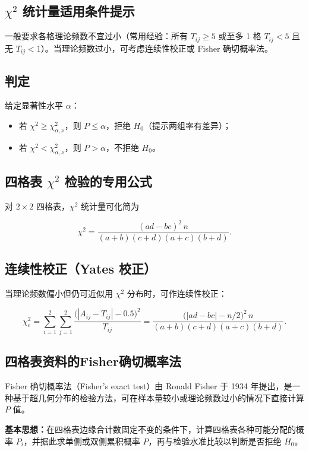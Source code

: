 \documentclass[lang=cn,10pt]{elegantbook}
\begin{document}
\subsection{$\chi^2$ 统计量适用条件提示}
一般要求各格理论频数不宜过小（常用经验：所有 $T_{ij}\ge 5$ 或至多 1 格 $T_{ij}<5$ 且无 $T_{ij}<1$）。当理论频数过小，可考虑连续性校正或 Fisher 确切概率法。

\subsection{判定}
给定显著性水平 $\alpha$：

\begin{itemize}
  \item 若 $\chi^2\ge \chi^2_{\alpha,\nu}$，则 $P\le \alpha$，拒绝 $H_0$（提示两组率有差异）；
  \item 若 $\chi^2< \chi^2_{\alpha,\nu}$，则 $P>\alpha$，不拒绝 $H_0$。
\end{itemize}

\subsection{四格表 $\chi^2$ 检验的专用公式}
对 $2\times 2$ 四格表，$\chi^2$ 统计量可化简为

\begin{equation}
  \chi^2=\frac{(ad-bc)^2\,n}{(a+b)(c+d)(a+c)(b+d)}.
\end{equation}

\subsection{连续性校正（Yates 校正）}
当理论频数偏小但仍可近似用 $\chi^2$ 分布时，可作连续性校正：

\begin{equation}
  \chi^2_c=\sum_{i=1}^{2}\sum_{j=1}^{2}\frac{\bigl(|A_{ij}-T_{ij}|-0.5\bigr)^2}{T_{ij}}
  =\frac{\bigl(|ad-bc|-n/2\bigr)^2\,n}{(a+b)(c+d)(a+c)(b+d)}.
\end{equation}

\subsection{四格表资料的Fisher确切概率法}
Fisher 确切概率法（Fisher's exact test）由 Ronald Fisher 于 1934 年提出，是一种基于超几何分布的检验方法，可在样本量较小或理论频数过小的情况下直接计算 $P$ 值。

\textbf{基本思想：}在四格表边缘合计数固定不变的条件下，计算四格表各种可能分配的概率 $P_i$，并据此求单侧或双侧累积概率 $P$，再与检验水准比较以判断是否拒绝 $H_0$。
\end{document}
